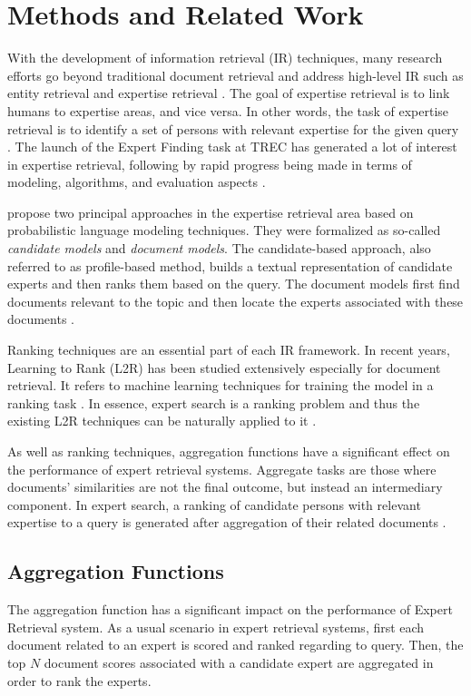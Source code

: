 \section{Methods and Related Work}
\label{sec:methods}
With the development of information retrieval (IR) techniques, many research efforts go beyond traditional document retrieval and address high-level IR such as entity retrieval and expertise retrieval \cite{er-sparse}. The goal of expertise retrieval is to link humans to expertise areas, and vice versa. In other words, the task of expertise retrieval is to identify a set of persons with relevant expertise for the given query \cite{er,er-community-aware}.
The launch of the Expert Finding task at TREC has generated a lot of interest in expertise retrieval, following by rapid progress being made in terms of modeling, algorithms, and evaluation aspects \cite{trec2005,er-community-aware}.

\cite{trec2005} propose two principal approaches  in the expertise retrieval area based on probabilistic language modeling techniques. They were formalized as so-called \textit{candidate models} and \textit{document models}. The candidate-based approach, also referred to as profile-based method, builds a textual representation of candidate experts and then ranks them based on the query. The document models first find documents relevant to the topic and then locate the experts associated with these documents \cite{er}.

Ranking techniques are an essential part of each IR framework. In recent years, Learning to Rank (L2R) has been studied extensively especially for document retrieval. It refers to machine learning techniques for training the model in a ranking task \cite{er}. In essence, expert search is a ranking problem and thus the existing L2R techniques can be naturally applied to it \cite{l2r-intro}.

As well as ranking techniques, aggregation functions have a significant effect on the performance of expert retrieval systems. Aggregate tasks are those where documents' similarities are not
the final outcome, but instead an intermediary component. In expert search, a ranking of candidate persons with relevant expertise to a query is generated after aggregation of their related documents \cite{agg-learning}.
\subsection{Aggregation Functions}
The aggregation function has a significant impact on the performance of Expert Retrieval system. As a usual scenario in expert retrieval systems, first each document related to an expert is scored and ranked regarding to query. Then, the top $N$ document scores associated with a candidate expert are aggregated in order to rank the experts. 

